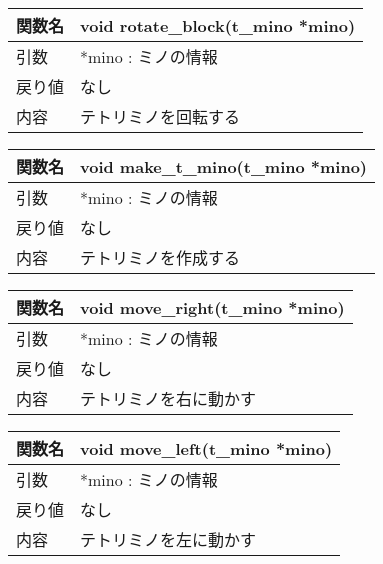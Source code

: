 \begin{table}[htb]
\begin{tabular}{|l|l|}
\hline
関数名 & void rotate\_block(t\_mino *mino) \\ \hline
引数  & *mino : ミノの情報                     \\ \hline
戻り値 & なし                                \\ \hline
内容  & テトリミノを回転する                        \\ \hline
\end{tabular}
\end{table}

\begin{table}[htb]
\begin{tabular}{|l|l|}
\hline
関数名 & void make\_t\_mino(t\_mino *mino) \\ \hline
引数  & *mino : ミノの情報                     \\ \hline
戻り値 & なし                                \\ \hline
内容  & テトリミノを作成する                        \\ \hline
\end{tabular}
\end{table}

\begin{table}[htb]
\begin{tabular}{|l|l|}
\hline
関数名 & void move\_right(t\_mino *mino) \\ \hline
引数  & *mino : ミノの情報                   \\ \hline
戻り値 & なし                              \\ \hline
内容  & テトリミノを右に動かす                     \\ \hline
\end{tabular}
\end{table}

\begin{table}[htb]
\begin{tabular}{|l|l|}
\hline
関数名 & void move\_left(t\_mino *mino) \\ \hline
引数  & *mino : ミノの情報                  \\ \hline
戻り値 & なし                             \\ \hline
内容  & テトリミノを左に動かす                    \\ \hline
\end{tabular}
\end{table}

